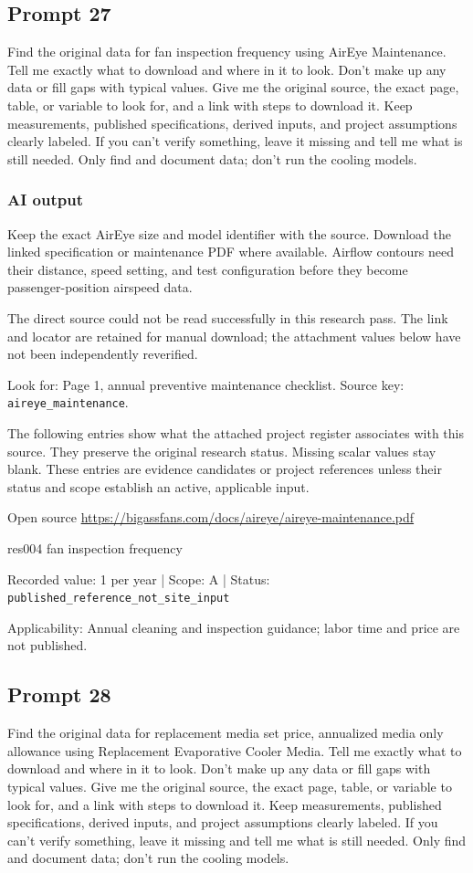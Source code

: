 \subsection*{Prompt 27}
Find the original data for fan inspection frequency using AirEye Maintenance. Tell me exactly what to download and where in it to look. Don’t make up any data or fill gaps with typical values. Give me the original source, the exact page, table, or variable to look for, and a link with steps to download it. Keep measurements, published specifications, derived inputs, and project assumptions clearly labeled. If you can’t verify something, leave it missing and tell me what is still needed. Only find and document data; don’t run the cooling models.

\subsubsection*{AI output}
Keep the exact AirEye size and model identifier with the source. Download the linked specification or maintenance PDF where available. Airflow contours need their distance, speed setting, and test configuration before they become passenger-position airspeed data.

The direct source could not be read successfully in this research pass. The link and locator are retained for manual download; the attachment values below have not been independently reverified.

Look for: Page 1, annual preventive maintenance checklist. Source key: \nolinkurl{aireye_maintenance}.

The following entries show what the attached project register associates with this source. They preserve the original research status. Missing scalar values stay blank. These entries are evidence candidates or project references unless their status and scope establish an active, applicable input.

Open source  \url{https://bigassfans.com/docs/aireye/aireye-maintenance.pdf}

res004  fan inspection frequency

Recorded value: 1 per year | Scope: A | Status: \nolinkurl{published_reference_not_site_input}

Applicability: Annual cleaning and inspection guidance; labor time and price are not published.

\subsection*{Prompt 28}
Find the original data for replacement media set price, annualized media only allowance using Replacement Evaporative Cooler Media. Tell me exactly what to download and where in it to look. Don’t make up any data or fill gaps with typical values. Give me the original source, the exact page, table, or variable to look for, and a link with steps to download it. Keep measurements, published specifications, derived inputs, and project assumptions clearly labeled. If you can’t verify something, leave it missing and tell me what is still needed. Only find and document data; don’t run the cooling models.

